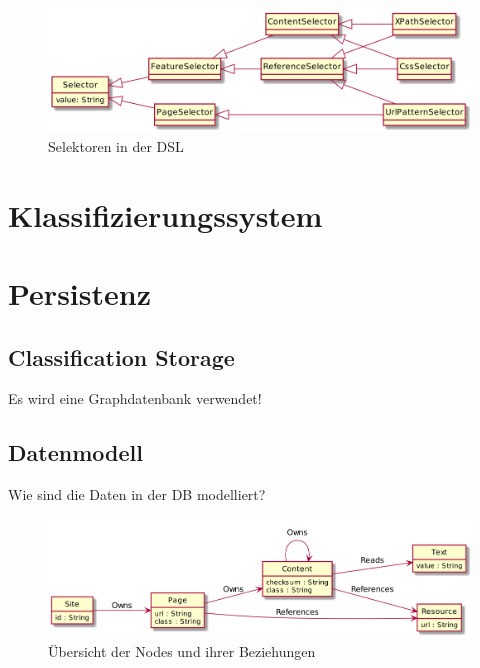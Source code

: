             \begin{figure}
                \centering
                \includegraphics[width=\textwidth]{../resources/dsl/selectors.png}
                \caption{Selektoren in der DSL}
                \label{image:dslSelektoren}
            \end{figure}
            

    \section{Klassifizierungssystem}
    \section{Persistenz}
        \subsection{Classification Storage}
            Es wird eine Graphdatenbank verwendet!
        
        \subsection{Datenmodell}
            Wie sind die Daten in der DB modelliert?
        
            \begin{figure}
                \centering
                \includegraphics[width=\textwidth]{../resources/db-data-model/nodes.png}
                \caption{Übersicht der Nodes und ihrer Beziehungen}
                \label{image:dbDataModelOverview}
            \end{figure}

